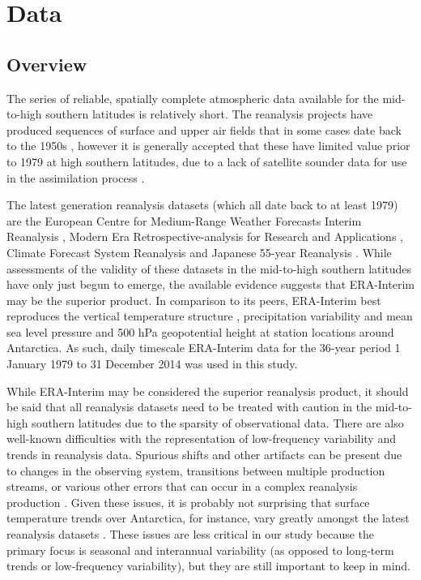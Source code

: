 \section{Data}\label{s:data}

\subsection{Overview}

The series of reliable, spatially complete atmospheric data available for the mid-to-high southern latitudes is relatively short. The reanalysis projects have produced sequences of surface and upper air fields that in some cases date back to the 1950s \citep{Kistler2001,Uppala2005,Kobayashi2015}, however it is generally accepted that these have limited value prior to 1979 at high southern latitudes, due to a lack of satellite sounder data for use in the assimilation process \citep{Hines2000}.

The latest generation reanalysis datasets (which all date back to at least 1979) are the European Centre for Medium-Range Weather Forecasts Interim Reanalysis \citep[ERA-Interim;][]{Dee2011}, Modern Era Retrospective-analysis for Research and Applications \citep[Merra;][]{Rienecker2011}, Climate Forecast System Reanalysis \citep[CFSR;][]{Saha2010} and Japanese 55-year Reanalysis \citep[JRA-55;][]{Kobayashi2015}. While assessments of the validity of these datasets in the mid-to-high southern latitudes have only just begun to emerge, the available evidence suggests that ERA-Interim may be the superior product. In comparison to its peers, ERA-Interim best reproduces the vertical temperature structure \citep{Screen2012}, precipitation variability \citep{Bromwich2011,Nicolas2011} and mean sea level pressure and 500 hPa geopotential height at station locations \citep{Bracegirdle2012} around Antarctica. As such, daily timescale ERA-Interim data for the 36-year period 1 January 1979 to 31 December 2014 was used in this study.

While ERA-Interim may be considered the superior reanalysis product, it should be said that all reanalysis datasets need to be treated with caution in the mid-to-high southern latitudes due to the sparsity of observational data. There are also well-known difficulties with the representation of low-frequency variability and trends in reanalysis data. Spurious shifts and other artifacts can be present due to changes in the observing system, transitions between multiple production streams, or various other errors that can occur in a complex reanalysis production \citep{Dee2014}. Given these issues, it is probably not surprising that surface temperature trends over Antarctica, for instance, vary greatly amongst the latest reanalysis datasets \citep{Nicolas2014}. These issues are less critical in our study because the primary focus is seasonal and interannual variability (as opposed to long-term trends or low-frequency variability), but they are still important to keep in mind.

